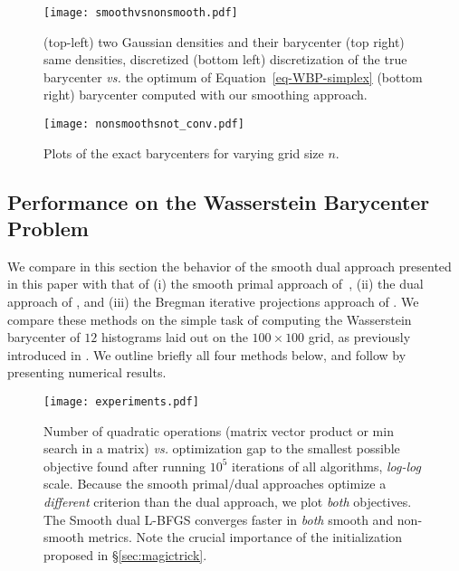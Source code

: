 \begin{figure}[ht]
	\centering\texttt{[image: smoothvsnonsmooth.pdf]}    
	\caption{(top-left) two Gaussian densities and their barycenter (top right) same densities, discretized (bottom left) discretization of the true barycenter \emph{vs.} the optimum of Equation~\ref{eq-WBP-simplex} (bottom right) barycenter computed with our smoothing approach. }\label{fig:smoothvsnonsmooth}
\end{figure}

\begin{figure}[ht]
\centering\texttt{[image: nonsmoothsnot\_conv.pdf]}    
\caption{Plots of the exact barycenters for varying grid size $n$.}
\label{fig:smoothvsnonsmooth2}
\end{figure}

\subsection{Performance on the Wasserstein Barycenter Problem}
We compare in this section the behavior of the smooth dual approach presented in this paper with that of (i) the smooth primal approach of~\cite{cuturi2014fast}, (ii) the dual approach of \cite{Carlier-NumericsBarycenters}, and (iii) the Bregman iterative projections approach of \cite{DBLP:journals/siamsc/BenamouCCNP15}. We compare these methods on the simple task of computing the Wasserstein barycenter of $12$ histograms laid out on the $100\times100$ grid, as previously introduced in \cite[\S3.2]{DBLP:journals/siamsc/BenamouCCNP15}. We outline briefly all four methods below, and follow by presenting numerical results.



\begin{figure}[h]
	\centering\texttt{[image: experiments.pdf]}
	\caption{Number of quadratic operations (matrix vector product or min search in a matrix) \emph{vs.} optimization gap to the smallest possible objective found after running $10^5$ iterations of all algorithms, \emph{log-log} scale. Because the smooth primal/dual approaches optimize a \emph{different} criterion than the dual approach, we plot \emph{both} objectives.  The Smooth dual L-BFGS converges faster in \emph{both} smooth and non-smooth metrics. Note the crucial importance of the initialization proposed in \S\ref{sec:magictrick}.}
\end{figure}



